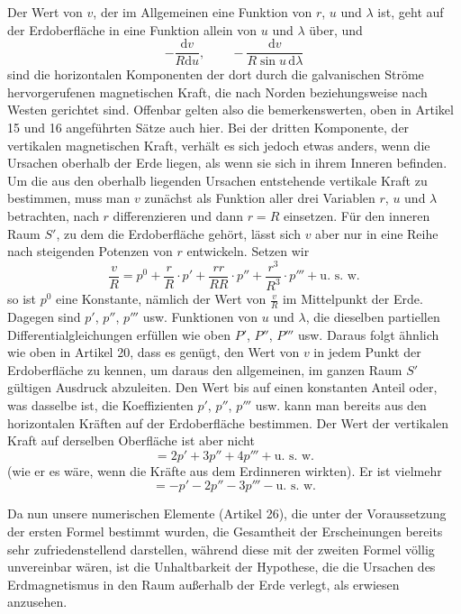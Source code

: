 Der Wert von $v$, der im Allgemeinen eine Funktion von $r$, $u$ und $\lambda$ ist, geht auf der Erdoberfläche in eine Funktion allein von $u$ und $\lambda$ über, und
\[
-\frac{\mathrm dv}{R\mathrm du},\qquad -\frac{\mathrm dv}{R\sin u\,\mathrm d\lambda}
\]
sind die horizontalen Komponenten der dort durch die galvanischen Ströme hervorgerufenen magnetischen Kraft, die nach Norden beziehungsweise nach Westen gerichtet sind. Offenbar gelten also die bemerkenswerten, oben in Artikel 15 und 16 angeführten Sätze auch hier. Bei der dritten Komponente, der vertikalen magnetischen Kraft, verhält es sich jedoch etwas anders, wenn die Ursachen oberhalb der Erde liegen, als wenn sie sich in ihrem Inneren befinden. Um die aus den oberhalb liegenden Ursachen entstehende vertikale Kraft zu bestimmen, muss man $v$ zunächst als Funktion aller drei Variablen $r$, $u$ und $\lambda$ betrachten, nach $r$ differenzieren und dann $r=R$ einsetzen. Für den inneren Raum $S'$, zu dem die Erdoberfläche gehört, lässt sich $v$ aber nur in eine Reihe nach steigenden Potenzen von $r$ entwickeln. Setzen wir
\[
\frac vR=p^0+\frac rR\cdot p'+\frac{rr}{RR}\cdot p''+\frac{r^3}{R^3}\cdot p'''+\text{u. s. w.}
\]
so ist $p^0$ eine Konstante, nämlich der Wert von $\frac vR$ im Mittelpunkt der
Erde. Dagegen sind $p'$, $p''$, $p'''$ usw. Funktionen von $u$ und $\lambda$, die dieselben partiellen Differentialgleichungen erfüllen wie oben $P'$, $P''$, $P'''$ usw. Daraus folgt ähnlich wie oben in Artikel 20, dass es genügt, den Wert von $v$ in jedem Punkt der Erdoberfläche zu kennen, um daraus den allgemeinen, im ganzen Raum $S'$ gültigen Ausdruck abzuleiten. Den Wert bis auf einen konstanten Anteil oder, was dasselbe ist, die Koeffizienten $p'$, $p''$, $p'''$ usw. kann man bereits aus den horizontalen Kräften auf der Erdoberfläche bestimmen. Der Wert der vertikalen Kraft auf derselben Oberfläche ist aber nicht
\[
=2p'+3p''+4p'''+\text{u. s. w.}
\]
(wie er es wäre, wenn die Kräfte aus dem Erdinneren wirkten). Er ist vielmehr
\[
=-p'-2p''-3p'''-\text{u. s. w.}
\]

Da nun unsere numerischen Elemente (Artikel 26), die unter der Voraussetzung der ersten Formel bestimmt wurden, die Gesamtheit der Erscheinungen bereits sehr zufriedenstellend darstellen, während diese mit der zweiten Formel völlig unvereinbar wären, ist die Unhaltbarkeit der Hypothese, die die Ursachen des Erdmagnetismus in den Raum außerhalb der Erde verlegt, als erwiesen anzusehen.

